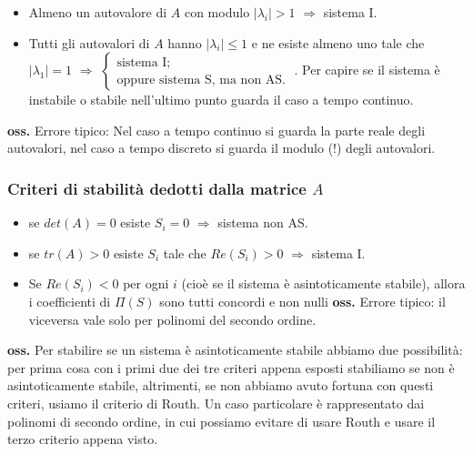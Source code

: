 \begin{landscape}
\begin{multicols*}{3}
\begin{itemize}
        \item Almeno un autovalore di $A$ con modulo $|\lambda_i| > 1$ $\Longrightarrow$ sistema I.
        \item Tutti gli autovalori di $A$ hanno $|\lambda_i| \leq 1$ e ne esiste almeno uno tale che $|\lambda_1| = 1$ $\Longrightarrow$ $\begin{cases}
            \text{sistema I;}\;\\
            \text{oppure sistema S, ma non AS.}\;
        \end{cases}$. \newline
        Per capire se il sistema è instabile o stabile nell'ultimo punto guarda il caso a tempo continuo.
    \end{itemize}
    \textbf{oss.} Errore tipico: Nel caso a tempo continuo si guarda la parte reale degli autovalori, nel caso a tempo discreto si guarda il modulo (!) degli autovalori.
    \subsubsection*{Criteri di stabilità dedotti dalla matrice $A$}
    \begin{itemize}
        \item se $det(A) = 0$ esiste $S_i = 0$ $\Longrightarrow$ sistema non AS.
        \item se $tr(A) >0$ esiste $S_i$ tale che $Re(S_i) > 0$ $\Longrightarrow$ sistema I.
        \item Se $Re(S_i)<0$ per ogni $i$ (cioè se il sistema è asintoticamente stabile), allora i coefficienti di $\Pi(S)$ sono tutti concordi e non nulli \newline
        \textbf{oss.} Errore tipico: il viceversa vale solo per polinomi del secondo ordine.
    \end{itemize}
    \textbf{oss.} Per stabilire se un sistema è asintoticamente stabile abbiamo due possibilità: per prima cosa con i primi due dei tre criteri appena esposti stabiliamo se non è asintoticamente stabile, altrimenti, se non abbiamo avuto fortuna con questi criteri, usiamo il criterio di Routh. Un caso particolare è rappresentato dai polinomi di secondo ordine, in cui possiamo evitare di usare Routh e usare il terzo criterio appena visto.

\end{multicols*}
\end{landscape}
